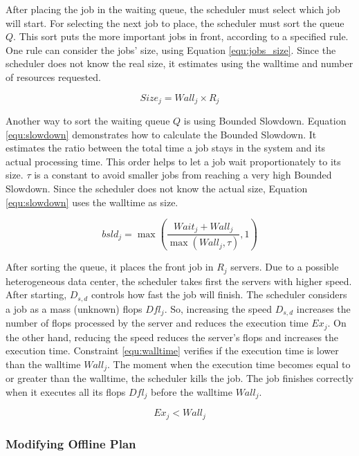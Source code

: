 After placing the job in the waiting queue, the scheduler must select which job will start. For selecting the next job to place, the scheduler must sort the queue $Q$. This sort puts the more important jobs in front, according to a specified rule. One rule can consider the jobs' size, using Equation \ref{equ:jobs_size}. Since the scheduler does not know the real size, it estimates using the walltime and number of resources requested.

\begin{equation}
    Size_j = Wall_j \times R_j
    \label{equ:jobs_size}
\end{equation}

Another way to sort the waiting queue $Q$ is using Bounded Slowdown. Equation \ref{equ:slowdown} demonstrates how to calculate the Bounded Slowdown. It estimates the ratio between the total time a job stays in the system and its actual processing time. This order helps to let a job wait proportionately to its size. $\tau$ is a constant to avoid smaller jobs from reaching a very high Bounded Slowdown. Since the scheduler does not know the actual size, Equation \ref{equ:slowdown} uses the walltime as size.

\begin{equation}
    bsld_j = \max(\frac{Wait_j + Wall_j}{\max(Wall_j, \tau)}, 1)
    \label{equ:slowdown}
\end{equation}

After sorting the queue, it places the front job in $R_j$ servers. Due to a possible heterogeneous data center, the scheduler takes first the servers with higher speed. After starting, $D_{s,d}$ controls how fast the job will finish. The scheduler considers a job as a mass (unknown) flops $Dfl_j$. So, increasing the speed $D_{s,d}$ increases the number of flops processed by the server and reduces the execution time $Ex_j$. On the other hand, reducing the speed reduces the server's flops and increases the execution time. Constraint \ref{equ:walltime} verifies if the execution time is lower than the walltime $Wall_j$. The moment when the execution time becomes equal to or greater than the walltime, the scheduler kills the job. The job finishes correctly when it executes all its flops $Dfl_j$ before the walltime $Wall_j$. 

\begin{equation}
    Ex_j < Wall_j
    \label{equ:walltime}
\end{equation}

\subsubsection{Modifying Offline Plan}

